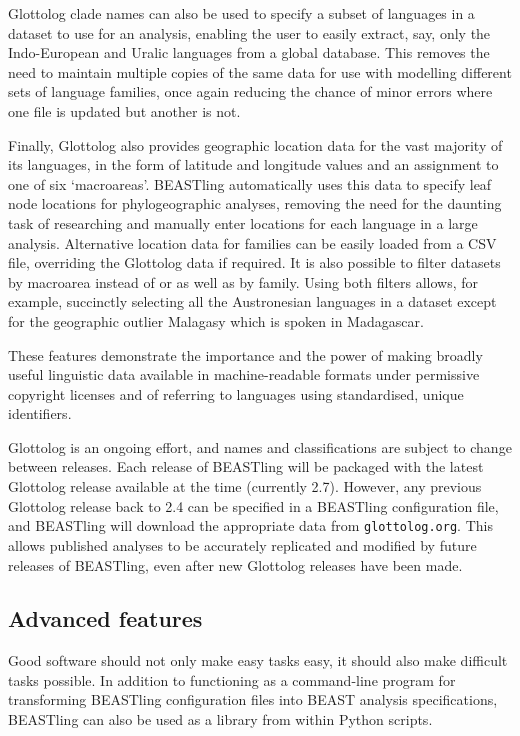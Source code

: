 \documentclass[10pt,a4paper]{article}
\begin{document}
Glottolog clade names can also be used to specify a subset of languages in a dataset to use for an analysis, enabling the user to easily extract, say, only the Indo-European and Uralic languages from a global database.  This removes the need to maintain multiple copies of the same data for use with modelling different sets of language families, once again reducing the chance of minor errors where one file is updated but another is not.

Finally, Glottolog also provides geographic location data for the vast majority of its languages, in the form of latitude and longitude values and an assignment to one of six `macroareas'\cite{Hammarstroem2014}.  BEASTling automatically uses this data to specify leaf node locations for phylogeographic analyses, removing the need for the daunting task of researching and manually enter locations for each language in a large analysis.  Alternative location data for families can be easily loaded from a CSV file, overriding the Glottolog data if required.  It is also possible to filter datasets by macroarea instead of or as well as by family.  Using both filters allows, for example, succinctly selecting all the Austronesian languages in a dataset except for the geographic outlier Malagasy which is spoken in Madagascar.

These features demonstrate the importance and the power of making broadly useful linguistic data available in machine-readable formats under permissive copyright licenses and of referring to languages using standardised, unique identifiers.

Glottolog is an ongoing effort, and names and classifications are subject to change between releases.  Each release of BEASTling will be packaged with the latest Glottolog release available at the time (currently 2.7).  However, any previous Glottolog release back to 2.4 can be specified in a BEASTling configuration file, and BEASTling will download the appropriate data from \texttt{glottolog.org}.  This allows published analyses to be accurately replicated and modified by future releases of BEASTling, even after new Glottolog releases have been made.

\subsection{Advanced features}

Good software should not only make easy tasks easy, it should also make difficult tasks possible.  In addition to functioning as a command-line program for transforming BEASTling configuration files into BEAST analysis specifications, BEASTling can also be used as a library from within Python scripts.
\end{document}
